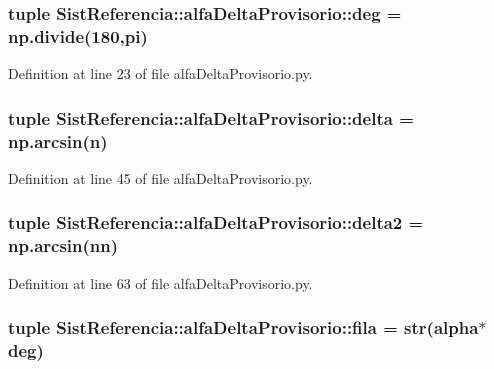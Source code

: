 \subsubsection[{deg}]{\setlength{\rightskip}{0pt plus 5cm}tuple {\bf \-Sist\-Referencia\-::alfa\-Delta\-Provisorio\-::deg} = np.\-divide(180,{\bf pi})}\label{namespace_sist_referencia_1_1alfa_delta_provisorio_adddeaf63c3fd36147374beaf136b8772}


\-Definition at line 23 of file alfa\-Delta\-Provisorio.\-py.

\subsubsection[{delta}]{\setlength{\rightskip}{0pt plus 5cm}tuple {\bf \-Sist\-Referencia\-::alfa\-Delta\-Provisorio\-::delta} = np.\-arcsin({\bf n})}\label{namespace_sist_referencia_1_1alfa_delta_provisorio_a3ec472a3eeb3325efdcfd8c4699862f4}


\-Definition at line 45 of file alfa\-Delta\-Provisorio.\-py.

\subsubsection[{delta2}]{\setlength{\rightskip}{0pt plus 5cm}tuple {\bf \-Sist\-Referencia\-::alfa\-Delta\-Provisorio\-::delta2} = np.\-arcsin({\bf nn})}\label{namespace_sist_referencia_1_1alfa_delta_provisorio_ada67be21affe857188d904fe8f2cfcbf}


\-Definition at line 63 of file alfa\-Delta\-Provisorio.\-py.

\subsubsection[{fila}]{\setlength{\rightskip}{0pt plus 5cm}tuple {\bf \-Sist\-Referencia\-::alfa\-Delta\-Provisorio\-::fila} = str({\bf alpha}$\ast${\bf deg})}\label{namespace_sist_referencia_1_1alfa_delta_provisorio_af65cd6cd30bec61d0052cd046e025188}


